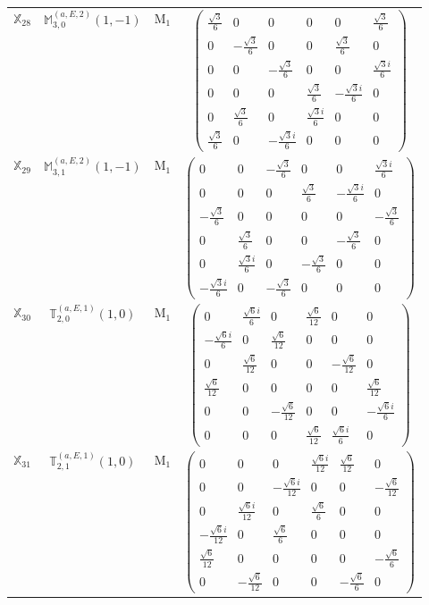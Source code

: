 \documentclass[fleqn,10pt,landscape]{article}
\begin{document}
\begin{itemize}
\begin{center}
\begin{longtable}{c|c|c|c}
$ \mathbb{X}_{28} $ & $\mathbb{M}_{3,0}^{(a,E,2)}(1,-1)$ & M$_{1}$ & $\begin{pmatrix} \frac{\sqrt{3}}{6} & 0 & 0 & 0 & 0 & \frac{\sqrt{3}}{6} \\ 0 & - \frac{\sqrt{3}}{6} & 0 & 0 & \frac{\sqrt{3}}{6} & 0 \\ 0 & 0 & - \frac{\sqrt{3}}{6} & 0 & 0 & \frac{\sqrt{3} i}{6} \\ 0 & 0 & 0 & \frac{\sqrt{3}}{6} & - \frac{\sqrt{3} i}{6} & 0 \\ 0 & \frac{\sqrt{3}}{6} & 0 & \frac{\sqrt{3} i}{6} & 0 & 0 \\ \frac{\sqrt{3}}{6} & 0 & - \frac{\sqrt{3} i}{6} & 0 & 0 & 0 \end{pmatrix}$ \\
$ \mathbb{X}_{29} $ & $\mathbb{M}_{3,1}^{(a,E,2)}(1,-1)$ & M$_{1}$ & $\begin{pmatrix} 0 & 0 & - \frac{\sqrt{3}}{6} & 0 & 0 & \frac{\sqrt{3} i}{6} \\ 0 & 0 & 0 & \frac{\sqrt{3}}{6} & - \frac{\sqrt{3} i}{6} & 0 \\ - \frac{\sqrt{3}}{6} & 0 & 0 & 0 & 0 & - \frac{\sqrt{3}}{6} \\ 0 & \frac{\sqrt{3}}{6} & 0 & 0 & - \frac{\sqrt{3}}{6} & 0 \\ 0 & \frac{\sqrt{3} i}{6} & 0 & - \frac{\sqrt{3}}{6} & 0 & 0 \\ - \frac{\sqrt{3} i}{6} & 0 & - \frac{\sqrt{3}}{6} & 0 & 0 & 0 \end{pmatrix}$ \\
$ \mathbb{X}_{30} $ & $\mathbb{T}_{2,0}^{(a,E,1)}(1,0)$ & M$_{1}$ & $\begin{pmatrix} 0 & \frac{\sqrt{6} i}{6} & 0 & \frac{\sqrt{6}}{12} & 0 & 0 \\ - \frac{\sqrt{6} i}{6} & 0 & \frac{\sqrt{6}}{12} & 0 & 0 & 0 \\ 0 & \frac{\sqrt{6}}{12} & 0 & 0 & - \frac{\sqrt{6}}{12} & 0 \\ \frac{\sqrt{6}}{12} & 0 & 0 & 0 & 0 & \frac{\sqrt{6}}{12} \\ 0 & 0 & - \frac{\sqrt{6}}{12} & 0 & 0 & - \frac{\sqrt{6} i}{6} \\ 0 & 0 & 0 & \frac{\sqrt{6}}{12} & \frac{\sqrt{6} i}{6} & 0 \end{pmatrix}$ \\
$ \mathbb{X}_{31} $ & $\mathbb{T}_{2,1}^{(a,E,1)}(1,0)$ & M$_{1}$ & $\begin{pmatrix} 0 & 0 & 0 & \frac{\sqrt{6} i}{12} & \frac{\sqrt{6}}{12} & 0 \\ 0 & 0 & - \frac{\sqrt{6} i}{12} & 0 & 0 & - \frac{\sqrt{6}}{12} \\ 0 & \frac{\sqrt{6} i}{12} & 0 & \frac{\sqrt{6}}{6} & 0 & 0 \\ - \frac{\sqrt{6} i}{12} & 0 & \frac{\sqrt{6}}{6} & 0 & 0 & 0 \\ \frac{\sqrt{6}}{12} & 0 & 0 & 0 & 0 & - \frac{\sqrt{6}}{6} \\ 0 & - \frac{\sqrt{6}}{12} & 0 & 0 & - \frac{\sqrt{6}}{6} & 0 \end{pmatrix}$ \\

\end{longtable}
\end{center}
\end{itemize}
\end{document}
